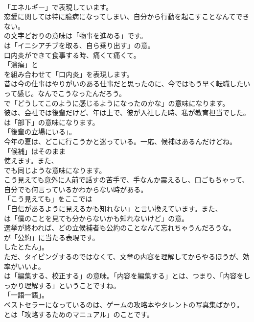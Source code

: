 \documentclass[8pt]{extreport}
\begin{document}
\begin{CJK}{UTF8}{min}
\\	「エネルギー」で表現しています。	
\\	恋愛に関しては特に臆病になってしまい、自分から行動を起こすことなんてできない。 
\\	の文字どおりの意味は「物事を進める」です。
\\	は「イニシアチブを取る、自ら乗り出す」の意。	
\\	口内炎ができて食事する時、痛くて痛くて。 
\\	「潰瘍」と
\\	を組み合わせて「口内炎」を表現します。	
\\	昔は今の仕事はやりがいのある仕事だと思ったのに、今ではもう早く転職したいって感じ。なんでこうなったんだろう。 
\\	で「どうしてこのように感じるようになったのかな」の意味になります。	
\\	彼は、会社では後輩だけど、年は上で、彼が入社した時、私が教育担当でした。 
\\	は「部下」の意味になります。
\\	「後輩の立場にいる」。	
\\	今年の夏は、どこに行こうかと迷っている。一応、候補はあるんだけどね。 
\\	「候補」はそのまま
\\	使えます。また、
\\	でも同じような意味になります。	
\\	こう見えても意外に人前で話すの苦手で、手なんか震えるし、口ごもちゃって、自分でも何言っているかわからない時がある。 
\\	「こう見えても」をここでは
\\	「自信があるように見えるかも知れない」と言い換えています。また、
\\	は「僕のことを見ても分からないかも知れないけど」の意。	
\\	選挙が終われば、どの立候補者も公約のことなんて忘れちゃうんだろうな。 
\\	が「公約」に当たる表現です。
\\	したとたん」。	
\\	ただ、タイピングするのではなくて、文章の内容を理解してからやるほうが、効率がいいよ。 
\\	は「編集する、校正する」の意味。「内容を編集する」とは、つまり、「内容をしっかり理解する」ということですね。
\\	「一語一語」。	
\\	ベストセラーになっているのは、ゲームの攻略本やタレントの写真集ばかり。 
\\	とは「攻略するためのマニュアル」のことです。	

\end{CJK}
\end{document}
